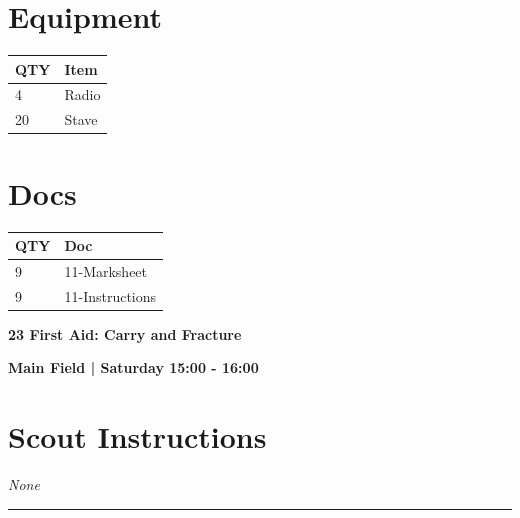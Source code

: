 \documentclass[10pt]{article}
\newcommand{\newtitle}[1]{\begin{center}{\Huge\bfseries #1 }\\ \vspace{5mm}\end{center}}
\newcommand{\newsubtitle}[1]{\begin{center}{\color{grey}\Large\bfseries #1 }\\ \vspace{5mm}\end{center}}
\begin{document}
	\begin{multicols}{2}

		\section*{\faWrench \: Equipment}

		
	\begin{center}
			\begin{tabular}{p{2cm}p{4cm}}


				\textbf{QTY} & \textbf{Item} \\\toprule
												4&Radio\\\midrule
												20&Stave\\\midrule
								\end{tabular}

			\end{center}

		
		\vfill\null
		\columnbreak

			\section*{\faFile \: Docs}
		 	\begin{center}
			\begin{tabular}{p{2cm}p{4cm}}

			\textbf{QTY} & \textbf{Doc} \\\toprule
										9&11-Marksheet\\\midrule
										9&11-Instructions\\\midrule
							\end{tabular}
			\end{center}
	

		\vfill\null

		\end{multicols}



	\vspace{1cm}


	\clearpage
		\newtitle{23 First Aid: Carry and Fracture }
	\newsubtitle{Main Field | Saturday 15:00 - 16:00}
		\setcounter{section}{22}
	\section*{Scout Instructions}
		\textit{None}
	
	\vspace{0.5cm}
	\hrule
	\vspace{0.5cm}
\end{document}
